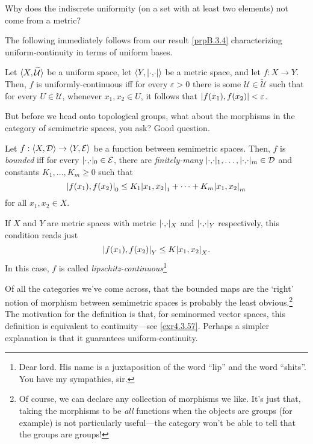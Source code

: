 \begin{exr}
Why does the indiscrete uniformity (on a set with at least two elements) not come from a metric?
\end{exr}
The following immediately follows from our result \cref{prpB.3.4} characterizing uniform-continuity in terms of uniform bases.
\begin{prp}\label{prp4.8.54}
Let $\langle X,\widetilde{\mathcal{U}}\rangle$ be a uniform space, let $\coord{Y,\metric}$ be a metric space, and let $f:X\rightarrow Y$.  Then, $f$ is uniformly-continuous iff for every $\varepsilon >0$ there is some $\mathcal{U}\in \widetilde{\mathcal{U}}$ such that for every $U\in \mathcal{U}$, whenever $x_1,x_2\in U$, it follows that $\metric[f(x_1)][f(x_2)]<\varepsilon$.
\end{prp}

But before we head onto topological groups, what about the morphisms in the category of semimetric spaces, you ask?  Good question.
\begin{dfn}\label{BoundedMap}
Let $f:\langle X,\mathcal{D}\rangle\rightarrow \langle Y,\mathcal{E}\rangle$ be a function between semimetric spaces.  Then, $f$ is \emph{bounded} iff for every $\metric _0\in \mathcal{E}$, there are \emph{finitely-many} $\metric _1,\ldots ,\metric _m\in \mathcal{D}$ and constants $K_1,\ldots ,K_m\geq 0$ such that
\begin{equation}
\metric[f(x_1)][f(x_2)]_0\leq K_1\metric[x_1][x_2]_1+\cdots +K_m\metric[x_1][x_2]_m
\end{equation}
for all $x_1,x_2\in X$.
\begin{rmk}
If $X$ and $Y$ are metric spaces with metric $\metric _X$ and $\metric _Y$ respectively, this condition reads just
\begin{equation}
\metric[f(x_1)][f(x_2)]_Y\leq K\metric[x_1][x_2]_X.
\end{equation}
In this case, $f$ is called \emph{lipschitz-continuous}\footnote{Dear lord.  His name is a juxtaposition of the word ``lip'' and the word ``shits''.  You have my sympathies, sir\textellipsis .}
\end{rmk}
\begin{rmk}
Of all the categories we've come across, that the bounded maps are the `right' notion of morphism between semimetric spaces is probably the least obvious.\footnote{Of course, we can declare any collection of morphisms we like.  It's just that, taking the morphisms to be \emph{all} functions when the objects are groups (for example) is not particularly useful---the category won't be able to tell that the groups are groups!}  The motivation for the definition is that, for seminormed vector spaces, this definition is equivalent to continuity---see \cref{exr4.3.57}.  Perhaps a simpler explanation is that it guarantees uniform-continuity.
\end{rmk}
\end{dfn}
